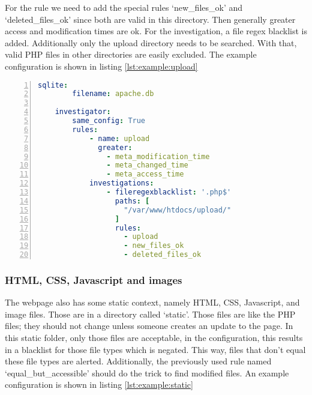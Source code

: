 For the rule we need to add the special rules `new\_files\_ok' and `deleted\_files\_ok' since both are valid in this directory. Then generally greater access and modification times are ok. For the investigation, a file regex blacklist is added. Additionally only the upload directory needs to be searched. With that, valid PHP files in other directories are easily excluded. The example configuration is shown in  listing \ref{lst:example:upload} 

\begin{lstlisting}[language=yaml, numbers=left, caption=Example Upload Directory Configuration, label=lst:example:upload]
    sqlite:
        filename: apache.db
    
    investigator:
        same_config: True
        rules: 
            - name: upload
              greater:
                - meta_modification_time
                - meta_changed_time
                - meta_access_time
            investigations:
                - fileregexblacklist: '.php$'
                  paths: [
                    "/var/www/htdocs/upload/"
                  ]
                  rules:
                    - upload
                    - new_files_ok
                    - deleted_files_ok

\end{lstlisting}

\subsubsection{HTML, CSS, Javascript and images}

The webpage also has some static context, namely HTML, CSS, Javascript, and image files. Those are in a directory called `static'. Those files are like the PHP files; they should not change unless someone creates an update to the page. In this static folder, only those files are acceptable, in the configuration, this results in a blacklist for those file types which is negated. This way, files that don't equal these file types are alerted. Additionally, the previously used rule named `equal\_but\_accessible' should do the trick to find modified files. An example configuration is shown in listing \ref{lst:example:static} 

